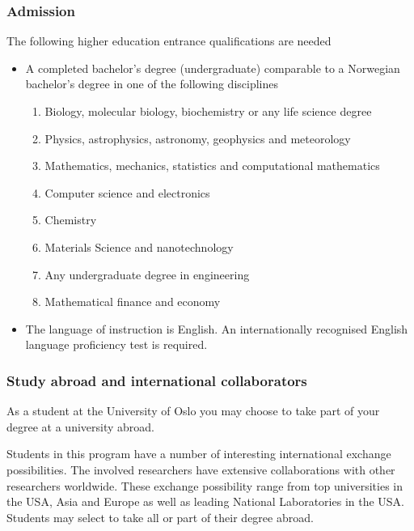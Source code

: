 \documentclass{beamer}
\begin{document}
\begin{frame}
\frametitle{Admission}

\begin{block}{}
The following higher education entrance qualifications are needed
\begin{itemize}
\item A completed bachelor's degree (undergraduate) comparable to a Norwegian bachelor's degree in one of the following disciplines
\begin{enumerate}

 \item Biology, molecular biology, biochemistry  or any life science degree

 \item Physics, astrophysics, astronomy, geophysics and meteorology

 \item Mathematics, mechanics, statistics and computational mathematics

 \item Computer science and electronics

 \item Chemistry

 \item Materials Science and nanotechnology

 \item Any undergraduate degree in engineering

 \item Mathematical finance and economy

\end{enumerate}

\noindent
\item The language of instruction is English. An internationally recognised English language proficiency test is required.
\end{itemize}

\noindent
\end{block}
\end{frame}

\begin{frame}
\frametitle{Study abroad and international collaborators}

\begin{block}{}

As a student at the University of Oslo you may choose to take part of
your degree at a university abroad. 

Students in this program have a number of interesting international
exchange possibilities. The involved researchers have extensive
collaborations with other researchers worldwide. These exchange
possibility range from top universities in the USA, Asia and Europe as
well as leading National Laboratories in the USA.  Students may select
to take all or part of their degree abroad.

\end{block}
\end{frame}
\end{document}

